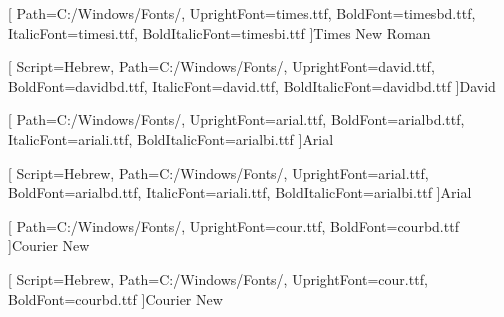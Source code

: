 
\usepackage{geometry}
\geometry{
  a4paper,
  top=2.5cm,
  bottom=2.5cm,
  inner=3.0cm,   %
  outer=2.5cm,
  headheight=16pt
}

\usepackage{amsmath,amssymb,amsfonts}

\makeatletter{}\makeatother
\usepackage[bidi=basic,provide=*,shorthands=off]{babel}
\usepackage{fontspec}

[
  Path=C:/Windows/Fonts/,
  UprightFont=times.ttf,
  BoldFont=timesbd.ttf,
  ItalicFont=timesi.ttf,
  BoldItalicFont=timesbi.ttf
]{Times New Roman}

[
  Script=Hebrew,
  Path=C:/Windows/Fonts/,
  UprightFont=david.ttf,
  BoldFont=davidbd.ttf,
  ItalicFont=david.ttf,
  BoldItalicFont=davidbd.ttf
]{David}

[
  Path=C:/Windows/Fonts/,
  UprightFont=arial.ttf,
  BoldFont=arialbd.ttf,
  ItalicFont=ariali.ttf,
  BoldItalicFont=arialbi.ttf
]{Arial}

[
  Script=Hebrew,
  Path=C:/Windows/Fonts/,
  UprightFont=arial.ttf,
  BoldFont=arialbd.ttf,
  ItalicFont=ariali.ttf,
  BoldItalicFont=arialbi.ttf
]{Arial}

[
  Path=C:/Windows/Fonts/,
  UprightFont=cour.ttf,
  BoldFont=courbd.ttf
]{Courier New}

[
  Script=Hebrew,
  Path=C:/Windows/Fonts/,
  UprightFont=cour.ttf,
  BoldFont=courbd.ttf
]{Courier New}

\newcommand{\hebrewfont}{\rmfamily}
\newcommand{\hebrewfontsf}{\sffamily}
\newcommand{\hebrewfonttt}{\ttfamily}
\newcommand{\englishfont}{\rmfamily}
\newcommand{\englishfontsf}{\sffamily}
\newcommand{\englishfonttt}{\ttfamily}

\providecommand{\texthebrew}[1]{\ifmmode\mbox{\foreignlanguage{hebrew}{#1}}\else\foreignlanguage{hebrew}{#1}\fi}
\providecommand{\textenglish}[1]{\ifmmode\mathrm{#1}\else\foreignlanguage{english}{#1}\fi}
\newenvironment{hebrew}{\begin{otherlanguage}{hebrew}}{\end{otherlanguage}}
\newenvironment{english}{\begin{otherlanguage}{english}}{\end{otherlanguage}}

